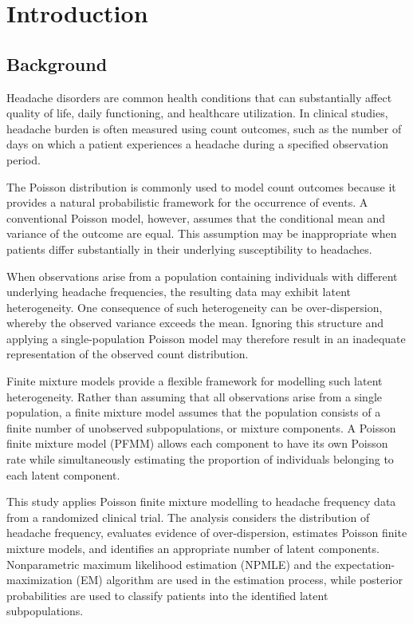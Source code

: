 
\section{Introduction}

\subsection{Background}

Headache disorders are common health conditions that can substantially affect
quality of life, daily functioning, and healthcare utilization. In clinical
studies, headache burden is often measured using count outcomes, such as the
number of days on which a patient experiences a headache during a specified
observation period.

The Poisson distribution is commonly used to model count outcomes because it
provides a natural probabilistic framework for the occurrence of events. A
conventional Poisson model, however, assumes that the conditional mean and
variance of the outcome are equal. This assumption may be inappropriate when
patients differ substantially in their underlying susceptibility to headaches.

When observations arise from a population containing individuals with
different underlying headache frequencies, the resulting data may exhibit
latent heterogeneity. One consequence of such heterogeneity can be
over-dispersion, whereby the observed variance exceeds the mean. Ignoring
this structure and applying a single-population Poisson model may therefore
result in an inadequate representation of the observed count distribution.

Finite mixture models provide a flexible framework for modelling such latent
heterogeneity. Rather than assuming that all observations arise from a single
population, a finite mixture model assumes that the population consists of a
finite number of unobserved subpopulations, or mixture components. A Poisson
finite mixture model (PFMM) allows each component to have its own Poisson rate
while simultaneously estimating the proportion of individuals belonging to
each latent component.

This study applies Poisson finite mixture modelling to headache frequency data
from a randomized clinical trial. The analysis considers the distribution of
headache frequency, evaluates evidence of over-dispersion, estimates Poisson
finite mixture models, and identifies an appropriate number of latent
components. Nonparametric maximum likelihood estimation (NPMLE) and the
expectation-maximization (EM) algorithm are used in the estimation process,
while posterior probabilities are used to classify patients into the
identified latent subpopulations.

